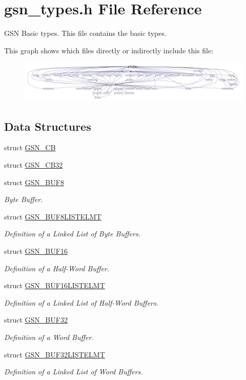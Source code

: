 \hypertarget{a00599}{
\section{gsn\_\-types.h File Reference}
\label{a00599}
}


GSN Basic types. This file contains the basic types.  


This graph shows which files directly or indirectly include this file:
\nopagebreak
\begin{figure}[H]
\begin{center}
\leavevmode
\includegraphics[width=400pt]{a00845}
\end{center}
\end{figure}
\subsection*{Data Structures}
\begin{DoxyCompactItemize}
\item 
struct \hyperlink{a00036}{GSN\_\-CB}
\item 
struct \hyperlink{a00037}{GSN\_\-CB32}
\item 
struct \hyperlink{a00033}{GSN\_\-BUF8}
\begin{DoxyCompactList}\small\item\em Byte Buffer. \end{DoxyCompactList}\item 
struct \hyperlink{a00034}{GSN\_\-BUF8LISTELMT}
\begin{DoxyCompactList}\small\item\em Definition of a Linked List of Byte Buffers. \end{DoxyCompactList}\item 
struct \hyperlink{a00029}{GSN\_\-BUF16}
\begin{DoxyCompactList}\small\item\em Definition of a Half-\/Word Buffer. \end{DoxyCompactList}\item 
struct \hyperlink{a00030}{GSN\_\-BUF16LISTELMT}
\begin{DoxyCompactList}\small\item\em Definition of a Linked List of Half-\/Word Buffers. \end{DoxyCompactList}\item 
struct \hyperlink{a00031}{GSN\_\-BUF32}
\begin{DoxyCompactList}\small\item\em Definition of a Word Buffer. \end{DoxyCompactList}\item 
struct \hyperlink{a00032}{GSN\_\-BUF32LISTELMT}
\begin{DoxyCompactList}\small\item\em Definition of a Linked List of Word Buffers. \end{DoxyCompactList}\end{DoxyCompactItemize}
